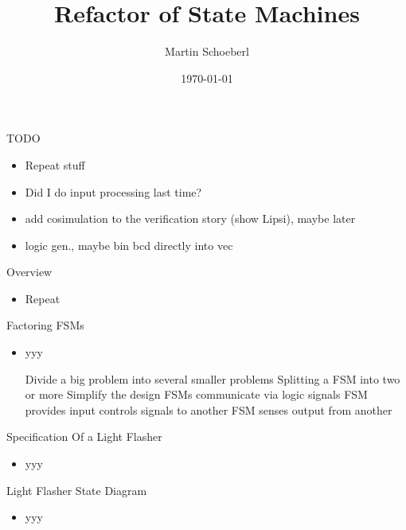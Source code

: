 

\newif\ifbook


\title{Refactor of State Machines}
\author{Martin Schoeberl}
\date{\today}



\begin{frame}
\titlepage
\end{frame}


\begin{frame}[fragile]{TODO}
\begin{itemize}
\item Repeat stuff
\item Did I do input processing last time?
\item add cosimulation to the verification story (show Lipsi), maybe later
\item logic gen., maybe bin bcd directly into vec
\end{itemize}
\end{frame}

\begin{frame}[fragile]{Overview}
\begin{itemize}
\item Repeat
\end{itemize}
\end{frame}

\begin{frame}[fragile]{Factoring FSMs}
\begin{itemize}
\item yyy

Divide a big problem into several smaller problems
Splitting a FSM into two or more
Simplify the design
FSMs communicate via logic signals
FSM provides input controls signals to another
FSM senses output from another
\end{itemize}
\end{frame}

\begin{frame}[fragile]{Specification Of a Light Flasher}
\begin{itemize}
\item yyy
\end{itemize}
\end{frame}

\begin{frame}[fragile]{Light Flasher State Diagram}
\begin{itemize}
\item yyy
\end{itemize}
\end{frame}


